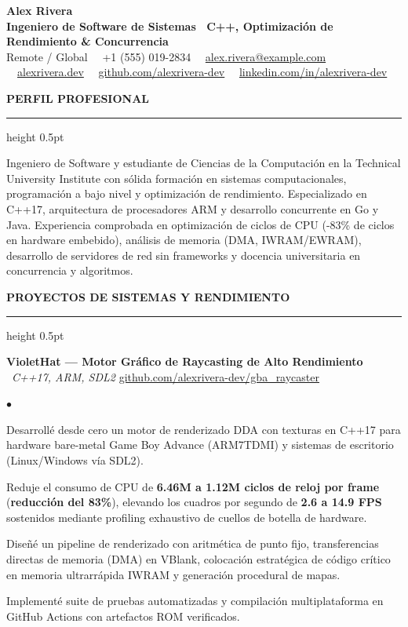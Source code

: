 \documentclass[10pt,letterpaper]{article}
\newcommand{\resumesection}[1]{%
  \vspace{2pt}%
  {\color{primary}\normalsize\bfseries\MakeUppercase{#1}}%
  \vspace{1pt}\hrule height 0.5pt\vspace{2pt}%
}
\renewenvironment{itemize}{%
  \begin{list}{\color{primary}$\bullet$}{%
    \setlength{\leftmargin}{1.1em}%
    \setlength{\itemsep}{0.5pt}%
    \setlength{\topsep}{1pt}%
    \setlength{\parsep}{0pt}%
    \setlength{\partopsep}{0pt}%
  }%
}{%
  \end{list}%
}
\begin{document}
\color{textdark}

\begin{center}
    {\LARGE \textbf{\color{primary} Alex Rivera}} \\ \vspace{1.5pt}
    {\large \textbf{Ingeniero de Software de Sistemas \textbar\ C++, Optimización de Rendimiento \& Concurrencia}} \\ \vspace{2pt}
    {\small
        Remote / Global \ \textbullet \
        +1 (555) 019-2834 \ \textbullet \
        \href{mailto:alex.rivera@example.com}{alex.rivera@example.com} \ \textbullet \
        \href{https://alexrivera.dev}{alexrivera.dev} \ \textbullet \
        \href{https://github.com/alexrivera-dev}{github.com/alexrivera-dev} \ \textbullet \
        \href{https://linkedin.com/in/alexrivera-dev}{linkedin.com/in/alexrivera-dev}
    }
\end{center}

\vspace{-6pt}

\resumesection{Perfil Profesional}
{\small Ingeniero de Software y estudiante de Ciencias de la Computación en la Technical University Institute con sólida formación en sistemas computacionales, programación a bajo nivel y optimización de rendimiento. Especializado en C++17, arquitectura de procesadores ARM y desarrollo concurrente en Go y Java. Experiencia comprobada en optimización de ciclos de CPU (-83\% de ciclos en hardware embebido), análisis de memoria (DMA, IWRAM/EWRAM), desarrollo de servidores de red sin frameworks y docencia universitaria en concurrencia y algoritmos.}

\resumesection{Proyectos de Sistemas y Rendimiento}

\textbf{VioletHat — Motor Gráfico de Raycasting de Alto Rendimiento} \textbar\ \textit{C++17, ARM, SDL2} \hfill \href{https://github.com/alexrivera-dev/gba_raycaster}{github.com/alexrivera-dev/gba\_raycaster}
\begin{itemize}
    \item Desarrollé desde cero un motor de renderizado DDA con texturas en C++17 para hardware bare-metal Game Boy Advance (ARM7TDMI) y sistemas de escritorio (Linux/Windows vía SDL2).
    \item Reduje el consumo de CPU de \textbf{6.46M a 1.12M ciclos de reloj por frame} (\textbf{reducción del 83\%}), elevando los cuadros por segundo de \textbf{2.6 a 14.9 FPS} sostenidos mediante profiling exhaustivo de cuellos de botella de hardware.
    \item Diseñé un pipeline de renderizado con aritmética de punto fijo, transferencias directas de memoria (DMA) en VBlank, colocación estratégica de código crítico en memoria ultrarrápida IWRAM y generación procedural de mapas.
    \item Implementé suite de pruebas automatizadas y compilación multiplataforma en GitHub Actions con artefactos ROM verificados.
\end{itemize}
\end{document}
